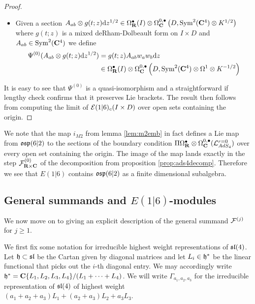 \documentclass[../main.tex]{subfiles}
\begin{document}
\begin{proof}
\begin{itemize}
\item Given a section 
$A_{ab} \otimes g(t; z)\mathrm{d} z^{1/2} \in \Omega^\bullet_{\mathbf{R}} (I)\otimes \Omega^{0,\bullet}_{\mathbf{C}} \left (D, \text{Sym}^2 (\mathbf{C}^4) \otimes K^{1/2}\right )$ where $g(t;z)$ is a mixed deRham-Dolbeault form on $I\times D$ and $A_{ab} \in \text{Sym}^2 (\mathbf{C}^4)$ we define
\begin{align*}
\Psi^{(0)} (A_{ab} \otimes g(t; z)\mathrm{d} z^{1/2}) &= g(t;z)  A_{ab} w_a w_b \mathrm{d} z \\
&\in \Omega^\bullet_{\mathbf{R}} (I) \otimes \Omega^{0,\bullet}_{\mathbf{C}} \left ( D, \text{Sym}^2 (\mathbf{C}^4) \otimes \Omega^1 \otimes K^{-1/2} \right )
\end{align*}
\end{itemize}
It is easy to see that $\Psi^{(0)}$ is a quasi-isomorphism and a straightforward if lengthy check confirms that it preserves Lie brackets. The result then follows from computing the limit of $\mathcal{E}(1|6)_c (I\times D)$ over open sets containing the origin. 
\end{proof}

\begin{rmk}
We note that the map $i_{M2}$ from lemma \ref{lem:m2emb} in fact defines a Lie map from $\mathfrak{osp}(6|2)$ to the sections of the boundary condition $\Pi \Omega^\bullet_{\mathbf{R}}\otimes \Omega^{0,\bullet}_{\mathbf{C}} (\mathcal{L}^{r=0}_{AdS_4} )$ over every open set containing the origin. The image of the map lands exactly in the step $\mathcal{F}^{(0)}_{\mathbf{R}\times \mathbf{C}}$ of the decomposition from proposition \ref{prop:ads4decomp}. Therefore we see that $E(1|6)$ contains $\mathfrak{osp}(6|2)$ as a finite dimensional subalgebra.  
\end{rmk}

\subsection{General summands and $E(1|6)$-modules}
We now move on to giving an explicit description of the general summand $\mathcal{F}^{(j)}$ for $j \geq 1$. 

We first fix some notation for irreducible highest weight representations of $\mathfrak{sl}(4)$. Let $\mathfrak{h}\subset \mathfrak{sl}$ be the Cartan given by diagonal matrices and let $L_i\in \mathfrak{h}^*$ be the linear functional that picks out the $i$-th diagonal entry. We may accordingly write $\mathfrak{h}^* = \mathbf{C} \{L_1, L_2, L_3, L_4\}/(L_1+\cdots + L_4)$. We will write $\Gamma_{a_1,a_2, a_3}$ for the irreducible representation of $\mathfrak{sl}(4)$ of highest weight $(a_1+a_2+a_3)L_1+(a_2+a_3)L_2 + a_3L_3$. 
\end{document}
